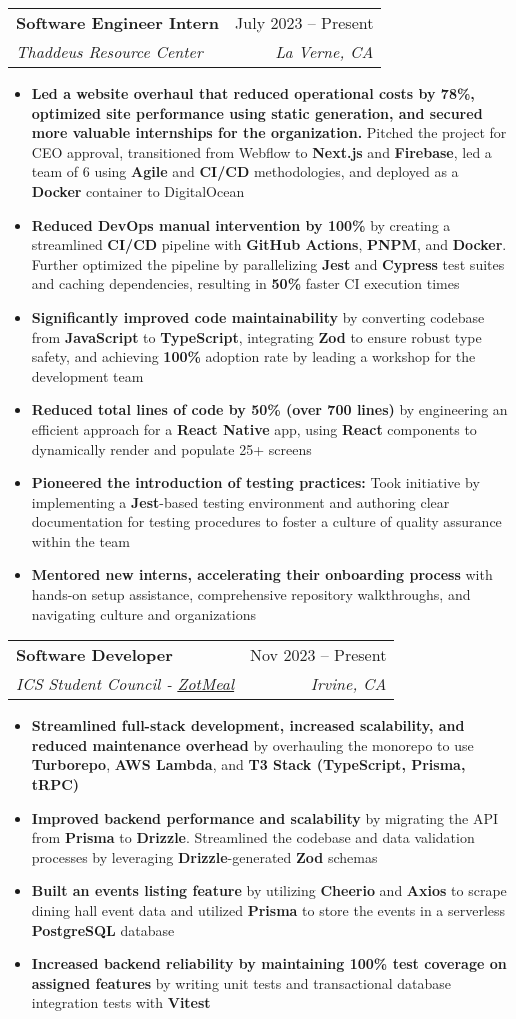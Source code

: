\documentclass[letterpaper,11pt]{article}
\makeatletter
\newcommand{\resumeItem}[1]{
  \item\setstretch{.95}\small{
    {#1 \vspace{-2pt}}
  }
}
\newcommand{\resumeSubheading}[4]{
  \vspace{-2pt}\item
    \begin{tabular*}{0.97\textwidth}[t]{l@{\extracolsep{\fill}}r}
      \textbf{#1} & #2 \\
      \textit{\small#3} & \textit{\small #4} \\
    \end{tabular*}\vspace{-4.8pt}
}
\newcommand{\resumeItemListStart}{\begin{itemize}}
\newcommand{\resumeItemListEnd}{\end{itemize}\vspace{-5pt}}
\makeatother
\begin{document}
    \resumeSubheading
      {Software Engineer Intern}{July 2023 -- Present}
      {Thaddeus Resource Center}{La Verne, CA}
      \resumeItemListStart
        \resumeItem{\textbf{Led a website overhaul that reduced operational costs by 78\%, optimized site performance using static generation, and secured more valuable internships for the organization.} Pitched the project for CEO approval, transitioned from Webflow to \textbf{Next.js} and \textbf{Firebase}, led a team of 6 using \textbf{Agile} and \textbf{CI/CD} methodologies, and deployed as a \textbf{Docker} container to DigitalOcean}
        \resumeItem{\textbf{Reduced DevOps manual intervention by 100\%} by creating a streamlined \textbf{CI/CD} pipeline with \textbf{GitHub Actions}, \textbf{PNPM}, and \textbf{Docker}. Further optimized the pipeline by parallelizing \textbf{Jest} and \textbf{Cypress} test suites and caching dependencies, resulting in \textbf{50\%} faster CI execution times}
        \resumeItem{\textbf{Significantly improved code maintainability} by converting codebase from \textbf{JavaScript} to \textbf{TypeScript}, integrating \textbf{Zod} to ensure robust type safety, and achieving \textbf{100\%} adoption rate by leading a workshop for the development team}
        \resumeItem{\textbf{Reduced total lines of code by 50\% (over 700 lines)} by engineering an efficient approach for a \textbf{React Native} app, using \textbf{React} components to dynamically render and populate 25+ screens}
        \resumeItem{\textbf{Pioneered the introduction of testing practices:} Took initiative by implementing a \textbf{Jest}-based testing environment and authoring clear documentation for testing procedures to foster a culture of quality assurance within the team}
        \resumeItem{\textbf{Mentored new interns, accelerating their onboarding process} with hands-on setup assistance, comprehensive repository walkthroughs, and navigating culture and organizations}
      \resumeItemListEnd

      \resumeSubheading
      {Software Developer}{Nov 2023 -- Present}
      {ICS Student Council - \href{https://github.com/icssc/ZotMeal}{\uline{ZotMeal}}}{Irvine, CA}
      \resumeItemListStart
      \resumeItem{\textbf{Streamlined full-stack development, increased scalability, and reduced maintenance overhead} by overhauling the monorepo to use \textbf{Turborepo}, \textbf{AWS Lambda}, and \textbf{T3 Stack (TypeScript, Prisma, tRPC)}}
      \resumeItem{\textbf{Improved backend performance and scalability} by migrating the API from \textbf{Prisma} to \textbf{Drizzle}. Streamlined the codebase and data validation processes by leveraging \textbf{Drizzle}-generated \textbf{Zod} schemas}
        \resumeItem{\textbf{Built an events listing feature} by utilizing \textbf{Cheerio} and \textbf{Axios} to scrape dining hall event data and utilized \textbf{Prisma} to store the events in a serverless \textbf{PostgreSQL} database}
        \resumeItem{\textbf{Increased backend reliability by maintaining 100\% test coverage on assigned features} by writing unit tests and transactional database integration tests with \textbf{Vitest}}
      \resumeItemListEnd
      
\end{document}
